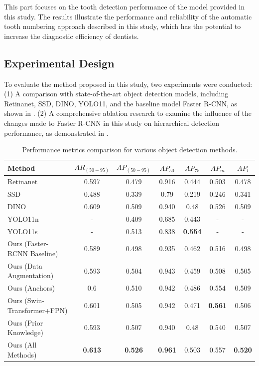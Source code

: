 \documentclass[pdflatex,sn-mathphys-num]{sn-jnl}%
\theoremstyle{thmstyleone}%
\theoremstyle{thmstyletwo}%
\theoremstyle{thmstylethree}%
\begin{document}
This part focuses on the tooth detection performance of the model provided in this study.  The results illustrate the performance and reliability of the automatic tooth numbering approach described in this study, which has the potential to increase the diagnostic efficiency of dentists.

\subsection{Experimental Design}

To evaluate the method proposed in this study, two experiments were conducted: (1) A comparison with state-of-the-art object detection models, including Retinanet\cite{i9}, SSD\cite{i11}, DINO\cite{i12}, YOLO11\cite{d1}, and the baseline model Faster R-CNN\cite{i8}, as shown in .  (2) A comprehensive ablation research to examine the influence of the changes made to Faster R-CNN in this study on hierarchical detection performance, as demonstrated in .

\begin{table}[h]
    \centering
    \caption{Performance metrics comparison for various object detection methods.}
    \label{tab:performance_metrics}
    \begin{tabular}{lcccccc}
        \hline
        Method & $AR_{(50-95)}$ & $AP_{(50-95)}$ & $AP_{50}$ & $AP_{75}$ & $AP_m$ & $AP_l$ \\
        \hline
        Retinanet & 0.597 & 0.479 & 0.916 & 0.444 & 0.503 & 0.478 \\ %
        SSD & 0.488 & 0.339 & 0.79 & 0.219 & 0.246 & 0.341 \\ %
        DINO & 0.609 & 0.509 & 0.940 & 0.48 & 0.526 & 0.509 \\ %
        YOLO11n & - & 0.409 & 0.685 & 0.443 & - & - \\ %
        YOLO11s & - & 0.513 & 0.838 & \textbf{0.554} & - & - \\ %
        Ours (Faster-RCNN Baseline) & 0.589 & 0.498 & 0.935 & 0.462 & 0.516 & 0.498 \\ %
        Ours (Data Augmentation) & 0.593 & 0.504 & 0.943 & 0.459 & 0.508 & 0.505 \\ %
        Ours (Anchors) & 0.6 & 0.510 & 0.942 & 0.486 & 0.554 & 0.509 \\ %
        Ours (Swin-Transformer+FPN) & 0.601 & 0.505 & 0.942 & 0.471 & \textbf{0.561} & 0.506 \\ %
        Ours (Prior Knowledge) & 0.593 & 0.507 & 0.940 & 0.48 & 0.540 & 0.507 \\ %
        Ours (All Methods) & \textbf{0.613} & \textbf{0.526} & \textbf{0.961} & 0.503 & 0.557 & \textbf{0.520} \\ %
        \hline
    \end{tabular}%
\end{table}
\end{document}
